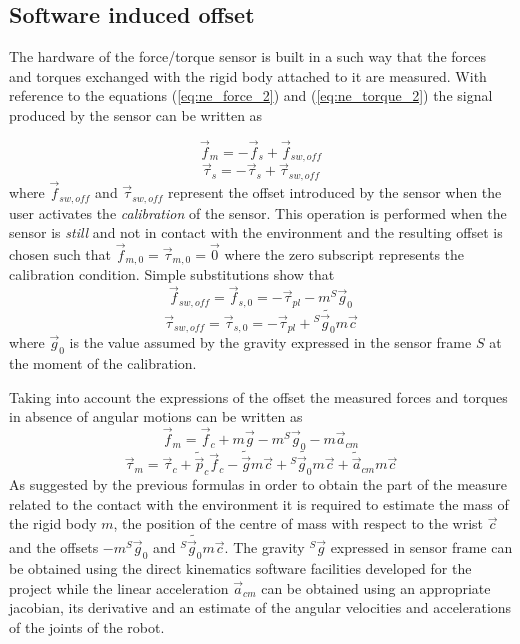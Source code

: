\subsection{Software induced offset}
The hardware of the force/torque sensor is built in a such way that the forces and torques exchanged
with the rigid body attached to it are measured. With reference to the equations (\ref{eq:ne_force_2})
and (\ref{eq:ne_torque_2}) the signal produced by the sensor can be written as

\[
\vec{f}_{m} = -\vec{f}_{s} + \vec{f}_{sw,off}
\]
\[
\vec{\tau}_{s} = -\vec{\tau}_{s} + \vec{\tau}_{sw,off}
\]
where $\vec{f}_{sw, off}$ and $\vec{\tau}_{sw,off}$ represent the offset introduced by
the sensor when the user activates the \emph{calibration} of the sensor. This operation
is performed when the sensor is \emph{still} and not in contact with the environment
and the resulting offset is chosen such that $\vec{f}_{m,0} = \vec{\tau}_{m,0} = \vec{0}$
where the zero subscript represents the calibration condition. Simple substitutions show that
\[
\vec{f}_{sw,off} = \vec{f}_{s,0} = -\vec{\tau}_{pl} -m {}^S \vec{g}_{0}
\]
\[
\vec{\tau}_{sw,off} = \vec{\tau}_{s,0} = -\vec{\tau}_{pl} + {}^S \tilde{\vec{g}_{0}} m\vec{c}
\]
where $\vec{g}_{0}$ is the value assumed by the gravity expressed in the sensor frame $S$ at the
moment of the calibration.
\par
Taking into account the expressions of the offset the measured forces and torques in absence of angular
motions can be written as
\begin{equation}
  \label{eq:m_force_2}
  \vec{f}_{m} = \vec{f}_{c} +m \vec{g} -m {}^S \vec{g}_{0} - m  \vec{a}_{cm}
\end{equation}
\begin{equation}
  \label{eq:m_torque_2}
  \vec{\tau}_{m} = \vec{\tau}_{c} + \tilde{\vec{p}}_{c}  \vec{f}_{c}
  - \tilde{\vec{g}} m\vec{c} + {}^S \tilde{\vec{g}_{0}} m\vec{c} +  \tilde{\vec{a}}_{cm} m  \vec{c}
\end{equation}
As suggested by the previous formulas in order to obtain the part of the measure related to the contact
with the environment it is required to estimate the mass of the rigid body $m$, the position of the centre of
mass with respect to the wrist $\vec{c}$ and the offsets $-m {}^S \vec{g}_{0}$ and ${}^S \tilde{\vec{g}_{0}} m\vec{c}$.
The gravity ${}^S \vec{g}$ expressed in sensor frame can be obtained using the direct kinematics software facilities
developed for the project while the linear acceleration $\vec{a}_{cm}$ can be obtained using an appropriate
jacobian, its derivative and an estimate of the angular velocities and accelerations of the joints
of the robot.

